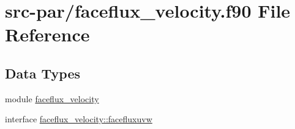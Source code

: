 \hypertarget{faceflux__velocity_8f90}{\section{src-\/par/faceflux\-\_\-velocity.f90 File Reference}
\label{faceflux__velocity_8f90}
}
\subsection*{Data Types}
\begin{DoxyCompactItemize}
\item 
module \hyperlink{classfaceflux__velocity}{faceflux\-\_\-velocity}
\item 
interface \hyperlink{interfacefaceflux__velocity_1_1facefluxuvw}{faceflux\-\_\-velocity\-::facefluxuvw}
\end{DoxyCompactItemize}
